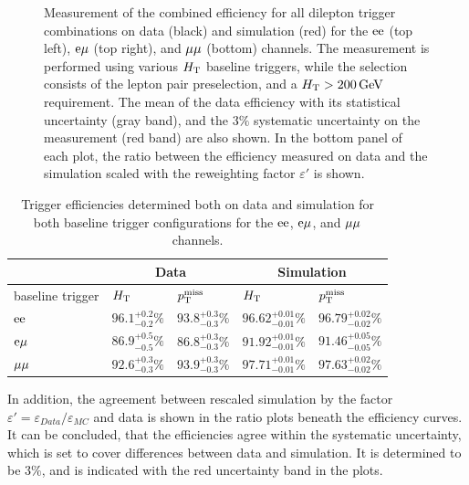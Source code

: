 \begin{figure}[htb]
 \caption{Measurement of the combined efficiency for all dilepton trigger combinations on data (black) and simulation (red) for the $\mathrm{e}\mathrm{e}$ (top left), $\mathrm{e}\mu$ (top right), and $\mu\mu$ (bottom) channels. The measurement is performed using various $H_{\mathrm{T}}$ baseline triggers, while the selection consists of the lepton pair preselection, and a $H_{\mathrm{T}}>200\,\text{Ge\hspace{-.08em}V}$ requirement. The mean of the data efficiency with its statistical uncertainty (gray band), and the $3\%$ systematic uncertainty on the measurement (red band) are also shown. In the bottom panel of each plot, the ratio between the efficiency measured on data and the simulation scaled with the reweighting factor $\varepsilon'$ is shown.}
 \label{fig:triggEff}
\end{figure}


\begin{table}[htb]
 \centering
 \caption{Trigger efficiencies determined both on data and simulation for both baseline trigger
  configurations for the $\mathrm{e}\mathrm{e}$, $\mathrm{e}{\mu}$, and ${\mu}{\mu}$ channels.}
 \label{tab:triggEff}
 \begin{tabular}{lllll}
                   & \multicolumn{2}{c}{Data} & \multicolumn{2}{c}{Simulation}                                                         \\\hline
  baseline trigger & $H_{\mathrm{T}}$                    & $p_{\mathrm{T}}^\text{miss}$                      & $H_{\mathrm{T}}$                     & $p_{\mathrm{T}}^\text{miss}$                 \\\hline
  $\mathrm{e}\mathrm{e}$         & $96.1^{+0.2}_{-0.2}\%$   & $93.8^{+0.3}_{-0.3}\%$         & $96.62^{+0.01}_{-0.01}\%$ & $96.79^{+0.02}_{-0.02}\%$ \\
  $\mathrm{e}{\mu}$        & $86.9^{+0.5}_{-0.5}\%$   & $86.8^{+0.3}_{-0.3}\%$         & $91.92^{+0.01}_{-0.01}\%$ & $91.46^{+0.05}_{-0.05}\%$ \\
  ${\mu}{\mu}$       & $92.6^{+0.3}_{-0.3}\%$   & $93.9^{+0.3}_{-0.3}\%$         & $97.71^{+0.01}_{-0.01}\%$ & $97.63^{+0.02}_{-0.02}\%$ \\\hline
 \end{tabular}
 \vspace{\baselineskip}
\end{table}


In addition, the agreement between rescaled simulation by the factor $\varepsilon'=\varepsilon_{Data}/\varepsilon_{MC}$ and data is shown in the ratio plots beneath the efficiency curves. It can be concluded, that the efficiencies agree within the systematic uncertainty, which is set to cover differences between data and simulation. It is determined to be $3\%$, and is indicated with the red uncertainty band in the plots.\\

